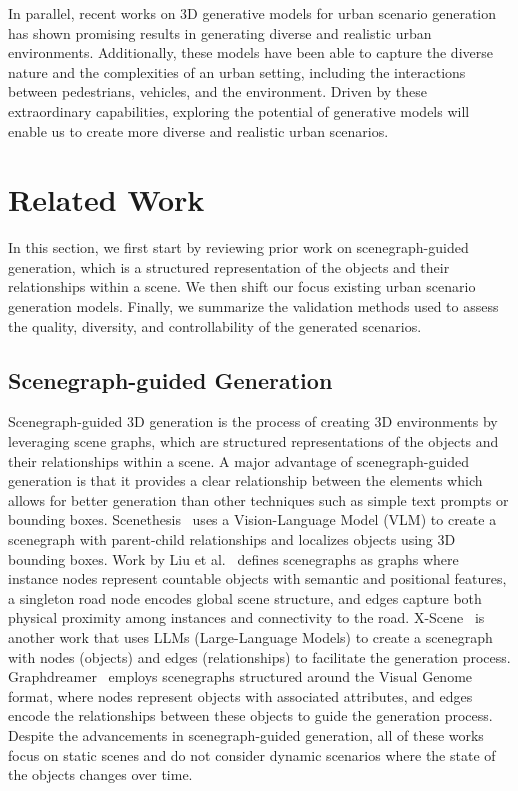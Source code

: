 \documentclass{article}
\begin{document}
In parallel, recent works on 3D generative models for urban scenario generation has shown promising results in generating diverse and realistic urban environments. Additionally, these models have been able to capture the diverse nature and the complexities of an urban setting, including the interactions between pedestrians, vehicles, and the environment. Driven by these extraordinary capabilities, exploring the potential of generative models will enable us to create more diverse and realistic urban scenarios.

\section{Related Work}

In this section, we first start by reviewing prior work on scenegraph-guided generation, which is a structured representation of the objects and their relationships within a scene. We then shift our focus existing urban scenario generation models. Finally, we summarize the validation methods used to assess the quality, diversity, and controllability of the generated scenarios.

\subsection{Scenegraph-guided Generation}

Scenegraph-guided 3D generation is the process of creating 3D environments by leveraging scene graphs, which are structured representations of the objects and their relationships within a scene. A major advantage of scenegraph-guided generation is that it provides a clear relationship between the elements which allows for better generation than other techniques such as simple text prompts or bounding boxes. Scenethesis~\cite{ling2025scenethesis} uses a Vision-Language Model (VLM) to create a scenegraph with parent-child relationships and localizes objects using 3D bounding boxes. Work by Liu et al.~\cite{liu2025controllable} defines scenegraphs as graphs where instance nodes represent countable objects with semantic and positional features, a singleton road node encodes global scene structure, and edges capture both physical proximity among instances and connectivity to the road. X-Scene~\cite{yang2025x} is another work that uses LLMs (Large-Language Models) to create a scenegraph with nodes (objects) and edges (relationships) to facilitate the generation process. Graphdreamer~\cite{gao2024graphdreamer} employs scenegraphs structured around the Visual Genome~\cite{krishna2017visual} format, where nodes represent objects with associated attributes, and edges encode the relationships between these objects to guide the generation process. Despite the advancements in scenegraph-guided generation, all of these works focus on static scenes and do not consider dynamic scenarios where the state of the objects changes over time.
\end{document}

